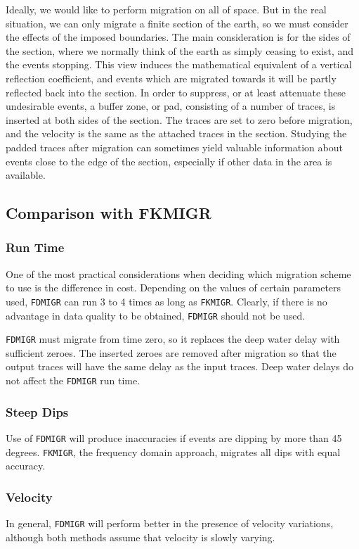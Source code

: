 Ideally, we would like to perform migration on all of space.  But in the
real situation, we can only migrate a finite section of the earth, so we
must consider the effects of the imposed boundaries.  The main
consideration is for the sides of the section, where we normally think
of the earth as simply ceasing to exist, and the events stopping.  This
view induces the mathematical equivalent of a vertical reflection
coefficient, and events which are migrated towards it will be partly
reflected back into the section.  In order to suppress, or at least
attenuate these undesirable events, a buffer zone, or pad, consisting of
a number of traces, is inserted at both sides of the section.  The traces
are set to zero before migration, and the velocity is the same as the
attached traces in the section.  Studying the padded traces after
migration can sometimes yield valuable information about events close to
the edge of the section, especially if other data in the area is
available.

\subsection{Comparison with FKMIGR}

\subsubsection{Run Time}
One of the most practical considerations when deciding which
migration scheme to use is the difference in cost.  Depending on the
values of certain parameters used, \texttt{FDMIGR} can run 3 to 4 times as long
as \texttt{FKMIGR}.  Clearly, if there is no advantage in data quality to be
obtained, \texttt{FDMIGR} should not be used.

\texttt{FDMIGR} must migrate from time zero, so it replaces the deep
water delay with sufficient zeroes.  The inserted zeroes are removed
after migration so that the output traces will have the same delay as
the input traces.  Deep water delays do not affect the \texttt{FDMIGR} run time.

\subsubsection{Steep Dips}
Use of \texttt{FDMIGR} will produce inaccuracies if events are dipping
by more than 45 degrees.  \texttt{FKMIGR}, the frequency domain approach,
migrates all dips with equal accuracy.

\subsubsection{Velocity}
In general, \texttt{FDMIGR} will perform better in the presence of
velocity variations, although both methods assume that velocity is
slowly varying.

